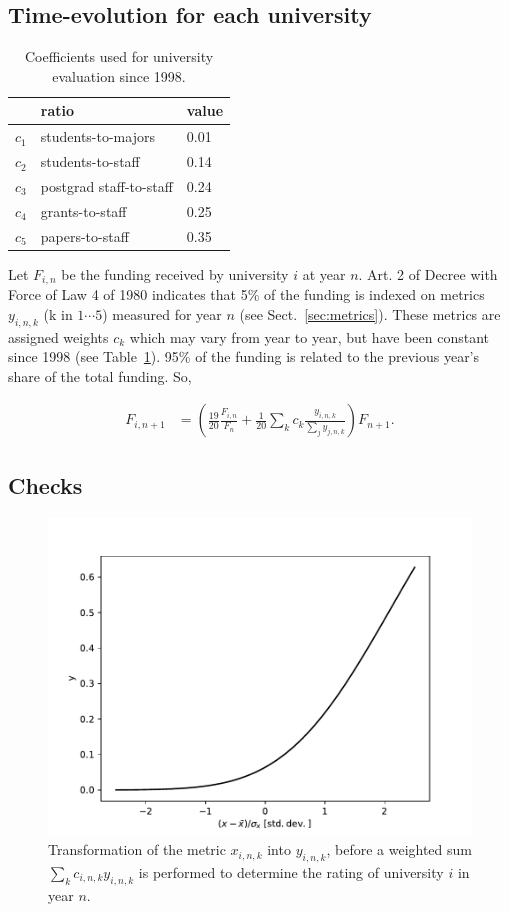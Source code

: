 \documentclass[twocolumn]{article}
\begin{document}
\subsection{Time-evolution for each university}
\begin{table}
\centering
\caption{Coefficients used for university evaluation since 1998.}
\label{tab:coeff}
\begin{tabular}{lll}
\hline\hline
      & ratio                   & value\\
\hline
$c_1$ & students-to-majors      & 0.01\\
$c_2$ & students-to-staff       & 0.14\\
$c_3$ & postgrad staff-to-staff & 0.24\\
$c_4$ & grants-to-staff         & 0.25\\
$c_5$ & papers-to-staff         & 0.35\\
\hline
\end{tabular}
\end{table}

Let $F_{i,n}$ be the funding received by university $i$ at year $n$. Art. 2 of
Decree with Force of Law 4 of 1980 indicates that 5\% of the funding is indexed
on metrics $y_{i,n,k}$ (k in $1\cdots5$) measured for year $n$ (see
Sect.~\ref{sec:metrics}). These metrics are assigned weights $c_k$ which may
vary from year to year, but have been constant since 1998 (see
Table~\ref{tab:coeff}). 95\% of the funding is related to the previous year's
share of the total funding.  So,

\begin{align}
    F_{i,n+1} &= \left( \frac{19}{20} \frac{F_{i,n}}{F_{n}} 
                      + \frac 1{20} \sum_k c_k \frac{y_{i,n,k}}{\sum_j y_{j,n,k}} 
                \right) F_{n+1}.
        \label{eq:afd}
\end{align}


\subsection{Checks}
\begin{figure}
\centering
\includegraphics[width=.85\linewidth]{transform.pdf}
\caption{Transformation of the metric $x_{i,n,k}$ into $y_{i,n,k}$, before a weighted sum 
$\sum_k c_{i,n,k} y_{i,n,k}$ is performed to determine the rating of university $i$ in year $n$.}
\label{fig:transform}
\end{figure}
\end{document}

